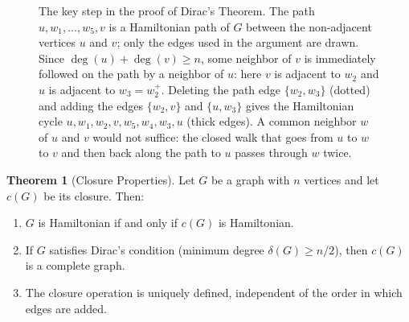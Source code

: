 \documentclass{article}
\theoremstyle{definition}
\newtheorem{theorem}{Theorem}
\begin{document}
\begin{figure}[h!]
\centering
{}
\caption{The key step in the proof of Dirac's Theorem. The path $u, w_1, \ldots, w_5, v$ is a Hamiltonian path of $G$ between the non-adjacent vertices $u$ and $v$; only the edges used in the argument are drawn. Since $\deg(u) + \deg(v) \geq n$, some neighbor of $v$ is immediately followed on the path by a neighbor of $u$: here $v$ is adjacent to $w_2$ and $u$ is adjacent to $w_3 = w_2^+$. Deleting the path edge $\{w_2, w_3\}$ (dotted) and adding the edges $\{w_2, v\}$ and $\{u, w_3\}$ gives the Hamiltonian cycle $u, w_1, w_2, v, w_5, w_4, w_3, u$ (thick edges). A common neighbor $w$ of $u$ and $v$ would not suffice: the closed walk that goes from $u$ to $w$ to $v$ and then back along the path to $u$ passes through $w$ twice.}
\label{fig:dirac-proof-step}
\end{figure}
\begin{theorem}[Closure Properties]
Let $G$ be a graph with $n$ vertices and let $c(G)$ be its closure. Then:
\begin{enumerate}
    \item $G$ is Hamiltonian if and only if $c(G)$ is Hamiltonian.
    \item If $G$ satisfies Dirac's condition (minimum degree $\delta(G) \geq n/2$), then $c(G)$ is a complete graph.
    \item The closure operation is uniquely defined, independent of the order in which edges are added.
\end{enumerate}
\end{theorem}
\end{document}
